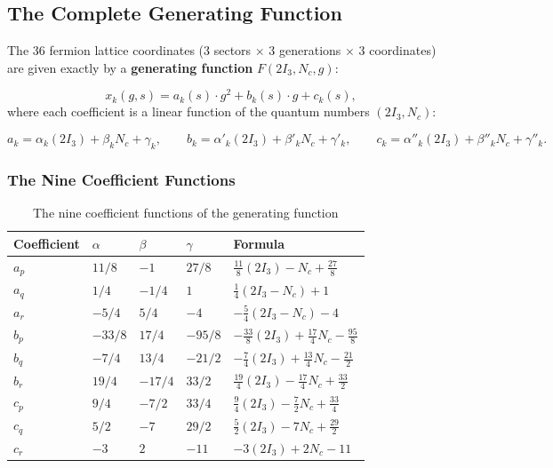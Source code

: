 \subsection{The Complete Generating Function}\label{sec:generating_function}

The 36 fermion lattice coordinates (3 sectors $\times$ 3 generations $\times$ 3 coordinates) are given exactly by a \textbf{generating function} $F(2I_3, N_c, g)$:

\begin{equation}
x_k(g, s) = a_k(s) \cdot g^2 + b_k(s) \cdot g + c_k(s),
\end{equation}
where each coefficient is a linear function of the quantum numbers $(2I_3, N_c)$:

\begin{equation}
a_k = \alpha_k (2I_3) + \beta_k N_c + \gamma_k, \qquad
b_k = \alpha'_k (2I_3) + \beta'_k N_c + \gamma'_k, \qquad
c_k = \alpha''_k (2I_3) + \beta''_k N_c + \gamma''_k.
\end{equation}

\subsubsection{The Nine Coefficient Functions}

\begin{table}[h]
\centering
\caption{The nine coefficient functions of the generating function}
\label{tab:coeff_functions}
\begin{tabular}{lllll}
\hline\hline
Coefficient & $\alpha$ & $\beta$ & $\gamma$ & Formula \\
\hline
$a_p$ & $11/8$ & $-1$ & $27/8$ & $\frac{11}{8}(2I_3) - N_c + \frac{27}{8}$ \\
$a_q$ & $1/4$ & $-1/4$ & $1$ & $\frac{1}{4}(2I_3 - N_c) + 1$ \\
$a_r$ & $-5/4$ & $5/4$ & $-4$ & $-\frac{5}{4}(2I_3 - N_c) - 4$ \\
$b_p$ & $-33/8$ & $17/4$ & $-95/8$ & $-\frac{33}{8}(2I_3) + \frac{17}{4}N_c - \frac{95}{8}$ \\
$b_q$ & $-7/4$ & $13/4$ & $-21/2$ & $-\frac{7}{4}(2I_3) + \frac{13}{4}N_c - \frac{21}{2}$ \\
$b_r$ & $19/4$ & $-17/4$ & $33/2$ & $\frac{19}{4}(2I_3) - \frac{17}{4}N_c + \frac{33}{2}$ \\
$c_p$ & $9/4$ & $-7/2$ & $33/4$ & $\frac{9}{4}(2I_3) - \frac{7}{2}N_c + \frac{33}{4}$ \\
$c_q$ & $5/2$ & $-7$ & $29/2$ & $\frac{5}{2}(2I_3) - 7N_c + \frac{29}{2}$ \\
$c_r$ & $-3$ & $2$ & $-11$ & $-3(2I_3) + 2N_c - 11$ \\
\hline\hline
\end{tabular}
\end{table}

